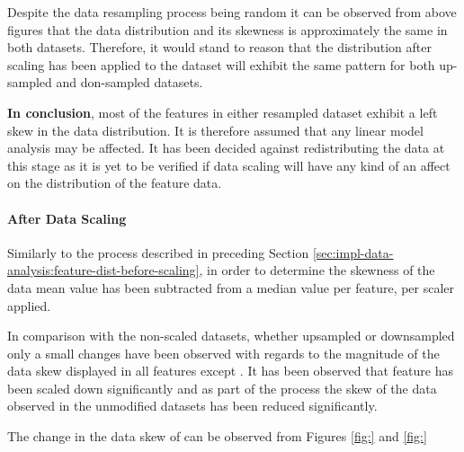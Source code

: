 Despite the data resampling process being random it can be observed from above figures that the data distribution and its skewness is approximately the same in both datasets. Therefore, it would stand to reason that the distribution after scaling has been applied to the dataset will exhibit the same pattern for both up-sampled and don-sampled datasets.

\textbf{In conclusion}, most of the features in either resampled dataset exhibit a left skew in the data distribution. It is therefore assumed that any linear model analysis may be affected. It has been decided against redistributing the data at this stage as it is yet to be verified if data scaling will have any kind of an affect on the distribution of the feature data.
\FloatBarrier

\paragraph{After Data Scaling}\label{sec:impl-data-analysis:feature-dist-after-scaling}
Similarly to the process described in preceding Section \ref{sec:impl-data-analysis:feature-dist-before-scaling}, in order to determine the skewness of the data mean value has been subtracted from a median value per feature, per scaler applied. 

In comparison with the non-scaled datasets, whether upsampled or downsampled only a small changes have been observed with regards to the magnitude of the data skew displayed in all features except \fileAgeInSec{}.
It has been observed that \fileAgeInSec{} feature has been scaled down significantly and as part of the process the skew of the data observed in the unmodified datasets has been reduced significantly. 

The change in the data skew of \fileAgeInSec{} can be observed from Figures \ref{fig:} and \ref{fig:}

